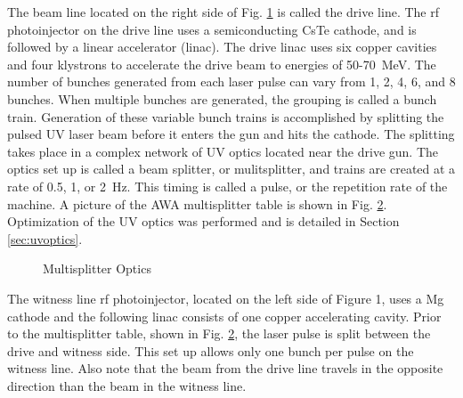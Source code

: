 \documentclass{iitthesis}
\begin{document}
The beam line located on the right side of Fig. \ref{fig:bunker} is called the
drive line. The rf photoinjector on the drive line uses a semiconducting
CsTe cathode, and is followed by a linear accelerator (linac). The
drive linac uses six copper cavities and four klystrons to accelerate the drive beam
to energies of 50-\SI{70}{MeV}. The number of bunches generated from each 
laser pulse can vary from 1, 2, 4, 6, and 8 bunches. When multiple bunches
are generated, the grouping is called a bunch train. Generation of
these variable bunch trains is accomplished by splitting the pulsed
UV laser beam before it enters the gun and hits the cathode. The splitting
takes place in a complex network of UV optics located near the drive
gun. The optics set up is called a beam splitter, or mulitsplitter,
and trains are created at a rate of 0.5, 1, or \SI{2}{Hz}. This timing is
called a pulse, or the repetition rate of the machine. A picture of
the AWA multisplitter table is shown in Fig. \ref{fig:optics}. Optimization 
of the UV optics was performed and is detailed in Section \ref{sec:uvoptics}.  
\begin{figure}
	\begin{center}
		\label{fig:bunker}
	\end{center}
\end{figure}
\begin{figure}
	\begin{center}
		\caption{Multisplitter Optics}
		\label{fig:optics}
	\end{center}
\end{figure}

The witness line rf photoinjector, located on the left side of Figure
1, uses a Mg cathode and the following linac consists of one copper
accelerating cavity. Prior to the multisplitter table, shown in
Fig. \ref{fig:optics}, the laser pulse is split between the drive and witness side.
This set up allows only one bunch per pulse on the witness line. Also
note that the beam from the drive line travels in the opposite direction
than the beam in the witness line. 



\end{document}
